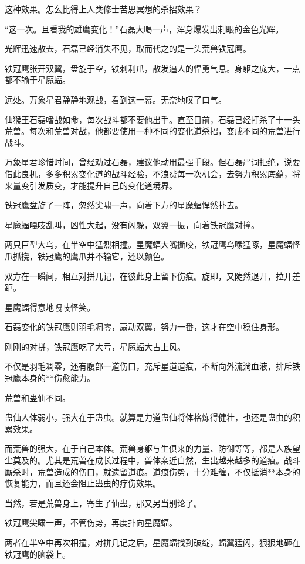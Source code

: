 \begin{this_body}
这种效果。怎么比得上人类修士苦思冥想的杀招效果？

“这一次。且看我的雄鹰变化！”石磊大喝一声，浑身爆发出刺眼的金色光辉。

光辉迅速散去，石磊已经消失不见，取而代之的是一头荒兽铁冠鹰。

铁冠鹰张开双翼，盘旋于空，铁刺利爪，散发逼人的悍勇气息。身躯之庞大，一点都不输于星魔蝠。

远处。万象星君静静地观战，看到这一幕。无奈地叹了口气。

仙猴王石磊嗜战如命，每次战斗都不要他出手。直至目前，石磊已经打杀了十一头荒兽。每次和荒兽对战，他都要使用一种不同的变化道杀招，变成不同的荒兽进行战斗。

万象星君珍惜时间，曾经劝过石磊，建议他动用最强手段。但石磊严词拒绝，说要借此良机，多多积累变化道的战斗经验，不浪费每一次机会，去努力积累底蕴，将来量变引发质变，才能提升自己的变化道境界。

铁冠鹰盘旋了一阵，忽然尖啸一声，向着下方的星魔蝠悍然扑去。

星魔蝠嘎吱乱叫，凶性大起，没有闪躲，双翼一振，向着铁冠鹰对撞。

两只巨型大鸟，在半空中猛烈相撞。星魔蝠大嘴撕咬，铁冠鹰鸟喙猛啄，星魔蝠怪爪抓挠，铁冠鹰的鹰爪并不输它，还以颜色。

双方在一瞬间，相互对拼几记，在彼此身上留下伤痕。旋即，又陡然退开，拉开差距。

星魔蝠得意地嘎吱怪笑。

石磊变化的铁冠鹰则羽毛凋零，扇动双翼，努力一番，这才在空中稳住身形。

刚刚的对拼，铁冠鹰吃了大亏，星魔蝠大占上风。

不仅是羽毛凋零，还有腹部一道伤口，充斥星道道痕，不断向外流淌血液，排斥铁冠鹰本身的**伤愈能力。

荒兽和蛊仙不同。

蛊仙人体弱小，强大在于蛊虫。就算是力道蛊仙将体格炼得健壮，也还是蛊虫的积累效果。

而荒兽的强大，在于自己本体。荒兽身躯与生俱来的力量、防御等等，都是人族望尘莫及的。尤其是荒兽在成长过程中，兽体亲近自然，生出越来越多的道痕。战斗厮杀时，荒兽造成的伤口，就遗留道痕。道痕伤势，十分难缠，不仅抵消**本身的恢复能力，而且还会阻止蛊虫的疗伤效果。

当然，若是荒兽身上，寄生了仙蛊，那又另当别论了。

铁冠鹰尖啸一声，不管伤势，再度扑向星魔蝠。

两者在半空中再次相撞，对拼几记之后，星魔蝠找到破绽，蝠翼猛闪，狠狠地砸在铁冠鹰的脑袋上。


\end{this_body}
